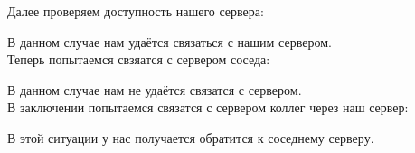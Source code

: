 \documentclass[a4paper,12pt]{article}
\begin{document}
Далее проверяем доступность нашего сервера:
\begin{figure}[H]
\end{figure}
В данном случае нам удаётся связаться с нашим сервером.\\
Теперь попытаемся свзяатся с сервером соседа:
\begin{figure}[H]
\end{figure}
В данном случае нам не удаётся связатся с сервером.\\
В заключении попытаемся связатся с сервером коллег через наш сервер:
\begin{figure}[H]
\end{figure}
В этой ситуации у нас получается обратится к соседнему серверу.
\end{document}
